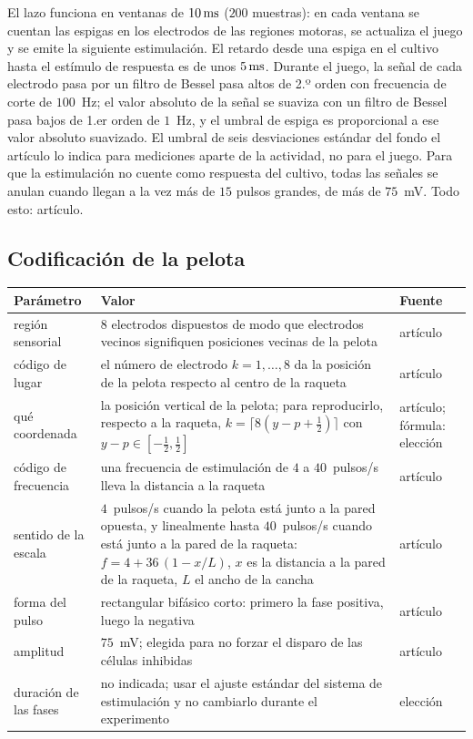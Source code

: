 El lazo funciona en ventanas de $10\,\text{ms}$ ($200$ muestras): en cada ventana se cuentan las espigas en los electrodos de las regiones motoras, se actualiza el juego y se emite la siguiente estimulación. El retardo desde una espiga en el cultivo hasta el estímulo de respuesta es de unos $5\,\text{ms}$. Durante el juego, la señal de cada electrodo pasa por un filtro de Bessel pasa altos de 2.º orden con frecuencia de corte de $100$~Hz; el valor absoluto de la señal se suaviza con un filtro de Bessel pasa bajos de 1.er orden de $1$~Hz, y el umbral de espiga es proporcional a ese valor absoluto suavizado. El umbral de seis desviaciones estándar del fondo el artículo lo indica para mediciones aparte de la actividad, no para el juego. Para que la estimulación no cuente como respuesta del cultivo, todas las señales se anulan cuando llegan a la vez más de $15$ pulsos grandes, de más de $75$~mV. Todo esto: artículo.

\subsection*{Codificación de la pelota}

\begin{center}
\footnotesize
\setlength{\tabcolsep}{4pt}
\renewcommand{\arraystretch}{1.15}
\begin{tabular}{>{\raggedright}p{3.4cm}>{\raggedright}p{7.5cm}>{\raggedright\arraybackslash}p{1.6cm}}
\toprule
Parámetro & Valor & Fuente \\
\midrule
región sensorial & $8$ electrodos dispuestos de modo que electrodos vecinos signifiquen posiciones vecinas de la pelota & artículo \\
código de lugar & el número de electrodo $k=1,\dots,8$ da la posición de la pelota respecto al centro de la raqueta & artículo \\
qué coordenada & la posición vertical de la pelota; para reproducirlo, respecto a la raqueta, $k=\lceil 8(y-p+\tfrac12)\rceil$ con $y-p\in[-\tfrac12,\tfrac12]$ & artículo; fórmula: elección \\
código de frecuencia & una frecuencia de estimulación de $4$ a $40$~pulsos/s lleva la distancia a la raqueta & artículo \\
sentido de la escala & $4$~pulsos/s cuando la pelota está junto a la pared opuesta, y linealmente hasta $40$~pulsos/s cuando está junto a la pared de la raqueta: $f=4+36\,(1-x/L)$, $x$ es la distancia a la pared de la raqueta, $L$ el ancho de la cancha & artículo \\
forma del pulso & rectangular bifásico corto: primero la fase positiva, luego la negativa & artículo \\
amplitud & $75$~mV; elegida para no forzar el disparo de las células inhibidas & artículo \\
duración de las fases & no indicada; usar el ajuste estándar del sistema de estimulación y no cambiarlo durante el experimento & elección \\
\bottomrule
\end{tabular}
\end{center}


